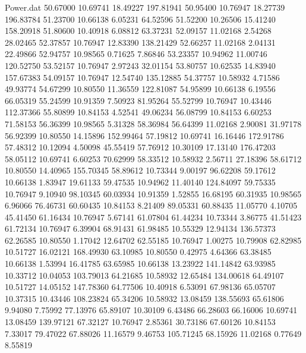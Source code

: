 \begin{filecontents}{Power.dat}
  50.67000   10.69741   18.49227  197.81941
  50.95400   10.76947   18.27739  196.83784
  51.23700   10.66138    6.05231   64.52596
  51.52200   10.26506   15.41240  158.20918
  51.80600   10.40918    6.08812   63.37231
  52.09157   11.02168    2.54268   28.02465
  52.37857   10.76947   12.83390  138.21429
  52.66257   11.02168    2.04131   22.49866
  52.94757   10.98565    0.71625    7.86846
  53.23357   10.94962   11.00746  120.52750
  53.52157   10.76947    2.97243   32.01154
  53.80757   10.62535   14.83940  157.67383
  54.09157   10.76947   12.54740  135.12885
  54.37757   10.58932    4.71586   49.93774
  54.67299   10.80550   11.36559  122.81087
  54.95899   10.66138    6.19556   66.05319
  55.24599   10.91359    7.50923   81.95264
  55.52799   10.76947   10.43446  112.37366
  55.80899   10.84153    4.52541   49.06234
  56.08799   10.84153    6.60253   71.58153
  56.36399   10.98565    5.31328   58.36984
  56.64399   11.02168    2.90081   31.97178
  56.92399   10.80550   14.15896  152.99464
  57.19812   10.69741   16.16446  172.91786
  57.48312   10.12094    4.50098   45.55419
  57.76912   10.30109   17.13140  176.47203
  58.05112   10.69741    6.60253   70.62999
  58.33512   10.58932    2.56711   27.18396
  58.61712   10.80550   14.40965  155.70345
  58.89612   10.73344    9.00197   96.62208
  59.17612   10.66138    1.83947   19.61133
  59.47535   10.94962   11.40140  124.84097
  59.75335   10.76947    9.10940   98.10345
  60.03934   10.91359    1.52855   16.68195
  60.31935   10.98565    6.96066   76.46731
  60.60435   10.84153    8.21409   89.05331
  60.88435   11.05770    4.10705   45.41450
  61.16434   10.76947    5.67141   61.07804
  61.44234   10.73344    3.86775   41.51423
  61.72134   10.76947    6.39904   68.91431
  61.98485   10.55329   12.94134  136.57373
  62.26585   10.80550    1.17042   12.64702
  62.55185   10.76947    1.00275   10.79908
  62.82985   10.51727   16.02121  168.49930
  63.10985   10.80550    0.42975    4.64366
  63.38485   10.66138    1.53994   16.41785
  63.65985   10.66138   13.23922  141.14842
  63.93985   10.33712   10.04053  103.79013
  64.21685   10.58932   12.65484  134.00618
  64.49107   10.51727   14.05152  147.78360
  64.77506   10.40918    6.53091   67.98136
  65.05707   10.37315   10.43446  108.23824
  65.34206   10.58932   13.08459  138.55693
  65.61806    9.94080    7.75992   77.13976
  65.89107   10.30109    6.43486   66.28603
  66.16006   10.69741   13.08459  139.97121
  67.32127   10.76947    2.85361   30.73186
  67.60126   10.84153    7.33017   79.47022
  67.88026   11.16579    9.46753  105.71245
  68.15926   11.02168    0.77649    8.55819

\end{filecontents}

